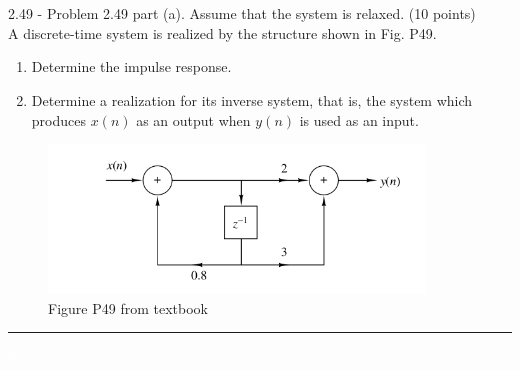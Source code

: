 \documentclass[a4paper, 11pt]{exam}
\begin{document}
\section{}
2.49 - Problem 2.49 part (a). Assume that the system is relaxed. (10 points)\\
A discrete-time system is realized by the structure shown in Fig. P49.\\
\begin{enumerate}
\item Determine the impulse response.
\item Determine a realization for its inverse system, that is, the system which produces $x(n)$ as an output when $y(n)$ is used as an input.
\end{enumerate}
\begin{figure}[ht!]
  \centering
  \includegraphics[width=10cm]{figures/fig49.png}
  \caption{Figure P49 from textbook}
    \label{fig:number49_fromText}
\end{figure}
\vspace{2em}
\hrule
\newpage
\textcolor{white}{ test }
\newpage
\end{document}
